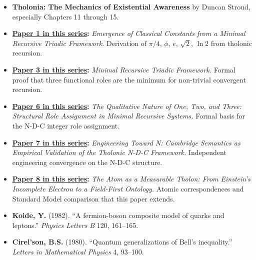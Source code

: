 \documentclass[12pt]{article}
\providecommand{\tightlist}{%
  \setlength{\itemsep}{0pt}\setlength{\parskip}{0pt}}
\begin{document}
\begin{itemize}
\tightlist
\item
  \textbf{Tholonia: The Mechanics of Existential Awareness} by Duncan
  Stroud, especially Chapters 11 through 15.
\item
  \textbf{\href{https://github.com/baardev/truevalue/blob/main/docnav/Research/papers/1_recursive-tholonic-five-constants/1_recursive-tholonic-five-constants.pdf}{Paper
  1 in this series}:} \emph{Emergence of Classical Constants from a
  Minimal Recursive Triadic Framework.} Derivation of \(\pi/4\),
  \(\phi\), \(e\), \(\sqrt{2}\), \(\ln 2\) from tholonic recursion.
\item
  \textbf{\href{https://github.com/baardev/truevalue/blob/main/docnav/Research/papers/3_minimal-recursive-triadic-framework/3_minimal-recursive-triadic-framework.pdf}{Paper
  3 in this series}:} \emph{Minimal Recursive Triadic Framework.} Formal
  proof that three functional roles are the minimum for non-trivial
  convergent recursion.
\item
  \textbf{\href{https://github.com/baardev/truevalue/blob/main/docnav/Research/papers/6_qualitative-nature-integers-triadic-roles/6_qualitative-nature-integers-triadic-roles.pdf}{Paper
  6 in this series}:} \emph{The Qualitative Nature of One, Two, and
  Three: Structural Role Assignment in Minimal Recursive Systems.}
  Formal basis for the N-D-C integer role assignment.
\item
  \textbf{\href{https://github.com/baardev/truevalue/blob/main/docnav/Research/papers/7_cambridge-semantics-tholonic-framework/7_cambridge-semantics-tholonic-framework.pdf}{Paper
  7 in this series}:} \emph{Engineering Toward N: Cambridge Semantics as
  Empirical Validation of the Tholonic N-D-C Framework.} Independent
  engineering convergence on the N-D-C structure.
\item
  \textbf{\href{https://github.com/baardev/truevalue/blob/main/docnav/Research/papers/8_atom-as-tholon-measurable-phenomena/8_atom-as-tholon-measurable-phenomena.pdf}{Paper
  8 in this series}:} \emph{The Atom as a Measurable Tholon: From
  Einstein's Incomplete Electron to a Field-First Ontology.} Atomic
  correspondences and Standard Model comparison that this paper extends.
\item
  \textbf{Koide, Y.} (1982). ``A fermion-boson composite model of quarks
  and leptons.'' \emph{Physics Letters B} 120, 161--165.
\item
  \textbf{Cirel'son, B.S.} (1980). ``Quantum generalizations of Bell's
  inequality.'' \emph{Letters in Mathematical Physics} 4, 93--100.

\end{itemize}
\end{document}
